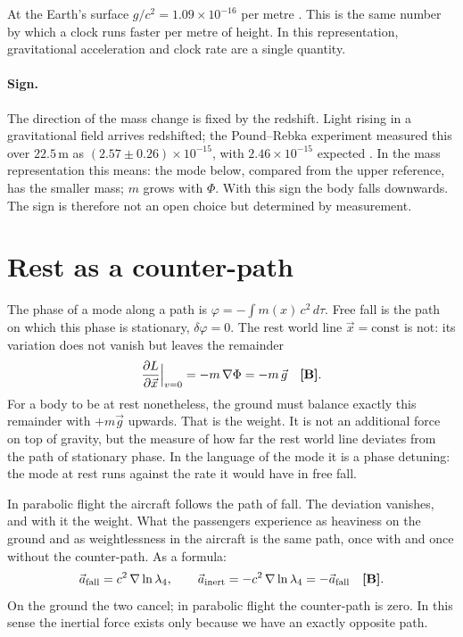 At the Earth's surface $g/c^2=1.09\times10^{-16}$ per metre \KM. This is the same number by which a
clock runs faster per metre of height. In this representation, gravitational acceleration and
clock rate are a single quantity.

\paragraph{Sign.} The direction of the mass change is fixed by the redshift. Light rising in a
gravitational field arrives redshifted; the Pound--Rebka experiment measured this over $22.5$\,m
as $(2.57\pm0.26)\times10^{-15}$, with $2.46\times10^{-15}$ expected \KM. In the mass
representation this means: the mode below, compared from the upper reference, has the smaller
mass; $m$ grows with $\Phi$. With this sign the body falls downwards. The sign is therefore not an
open choice but determined by measurement.

\section{Rest as a counter-path}

The phase of a mode along a path is $\varphi=-\int m(x)\,c^2\,d\tau$. Free fall is the path on
which this phase is stationary, $\delta\varphi=0$. The rest world line $\vec x=\text{const}$ is
not: its variation does not vanish but leaves the remainder
\begin{equation}
\frac{\partial L}{\partial \vec x}\Big|_{v=0}=-m\,\nabla\Phi=-m\,\vec g\quad\textbf{[B]}.
\end{equation}
For a body to be at rest nonetheless, the ground must balance exactly this remainder with
$+m\vec g$ upwards. That is the weight. It is not an additional force on top of gravity, but the
measure of how far the rest world line deviates from the path of stationary phase. In the language
of the mode it is a phase detuning: the mode at rest runs against the rate it would have in free
fall.

In parabolic flight the aircraft follows the path of fall. The deviation vanishes, and with it
the weight. What the passengers experience as heaviness on the ground and as weightlessness in the
aircraft is the same path, once with and once without the counter-path. As a formula:
\begin{equation}
\vec a_{\text{fall}}=c^2\,\nabla\ln\lambda_4,\qquad
\vec a_{\text{inert}}=-c^2\,\nabla\ln\lambda_4=-\vec a_{\text{fall}}\quad\textbf{[B]}.
\end{equation}
On the ground the two cancel; in parabolic flight the counter-path is zero. In this sense the
inertial force exists only because we have an exactly opposite path.

